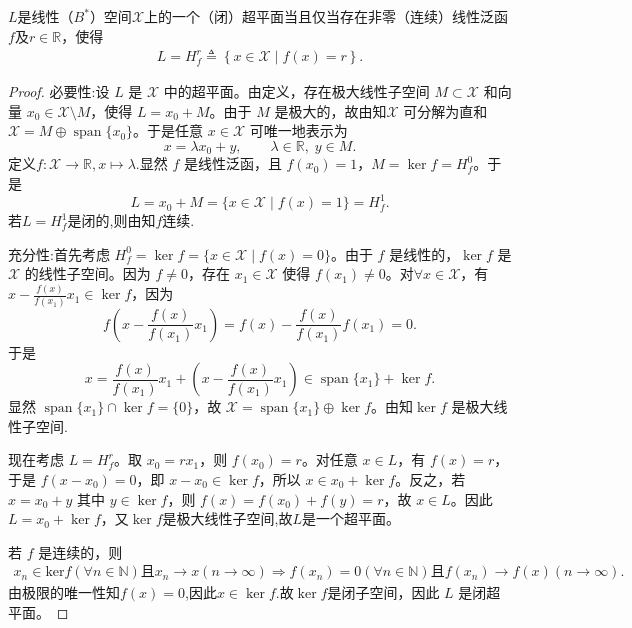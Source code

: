 \documentclass[../../main.tex]{subfiles}%
\begin{document}
\begin{theorem}\label{theorem:超平面是闭的当且仅当存在非零连续泛函}
$L$是线性（$B^*$）空间$\mathscr{X}$上的一个（闭）超平面当且仅当存在非零（连续）线性泛函$f$及$r \in \mathbb{R}$，使得
\begin{align*}
L=H_{f}^{r}\triangleq \left\{ x\in \mathscr{X} \mid f\left( x \right) =r \right\} .
\end{align*}
\end{theorem}
\begin{proof}

{\heiti 必要性:}设 $L$ 是 $\mathscr{X}$ 中的超平面。由定义，存在极大线性子空间 $M\subset\mathscr{X}$ 和向量 $x_0\in\mathscr{X}\setminus M$，使得 $L = x_0 + M$。由于 $M$ 是极大的，故由知$\mathscr{X}$ 可分解为直和 $\mathscr{X} = M \oplus \operatorname{span}\{x_0\}$。于是任意 $x\in\mathscr{X}$ 可唯一地表示为
\[
x = \lambda x_0 + y, \qquad \lambda\in\mathbb{R},\; y\in M.
\]
定义$f:\mathscr{X}\to\mathbb{R},x\mapsto \lambda$.显然 $f$ 是线性泛函，且 $f(x_0)=1$，$M = \ker f = H_f^0$。于是
\[
L = x_0 + M = \{x\in\mathscr{X}\mid f(x)=1\} = H_f^1.
\]
若$L=H_f^1$是闭的,则由知$f$连续.

{\heiti 充分性:}首先考虑 $H_f^0 = \ker f = \{ x \in \mathscr{X} \mid f(x) = 0 \}$。由于 $f$ 是线性的，$\ker f$ 是 $\mathscr{X}$ 的线性子空间。因为 $f \neq 0$，存在 $x_1 \in \mathscr{X}$ 使得 $f(x_1) \neq 0$。对$\forall x \in \mathscr{X}$，有$x - \frac{f(x)}{f(x_1)} x_1 \in \ker f$，因为
\[
f(x - \frac{f(x)}{f(x_1)} x_1) = f(x) - \frac{f(x)}{f(x_1)} f(x_1) = 0.
\]
于是
\[
x = \frac{f(x)}{f(x_1)} x_1 + (x - \frac{f(x)}{f(x_1)} x_1) \in \operatorname{span}\{x_1\} + \ker f.
\]
显然 $\operatorname{span}\{x_1\} \cap \ker f = \{0\}$，故 $\mathscr{X} = \operatorname{span}\{x_1\} \oplus \ker f$。由知$\ker f$ 是极大线性子空间.

现在考虑 $L = H_f^r$。取 $x_0 = r x_1$，则 $f(x_0) = r$。对任意 $x \in L$，有 $f(x) = r$，于是 $f(x - x_0) = 0$，即 $x - x_0 \in \ker f$，所以 $x \in x_0 + \ker f$。反之，若 $x = x_0 + y$ 其中 $y \in \ker f$，则 $f(x) = f(x_0) + f(y) = r$，故 $x \in L$。因此 $L = x_0 + \ker f$，又$\ker f$是极大线性子空间,故$L$是一个超平面。

若 $f$ 是连续的，则
\begin{align*}
x_n\in \mathrm{ker}f\left( \forall n\in \mathbb{N} \right) \text{且}x_n\rightarrow x\left( n\rightarrow \infty \right) \Longrightarrow f\left( x_n \right) =0\left( \forall n\in \mathbb{N} \right) \text{且}f\left( x_n \right) \rightarrow f\left( x \right) \left( n\rightarrow \infty \right) .
\end{align*}
由极限的唯一性知$f(x)=0$,因此$x\in \ker f$.故$\ker f$是闭子空间，因此 $L$ 是闭超平面。
\end{proof}
\end{document}
